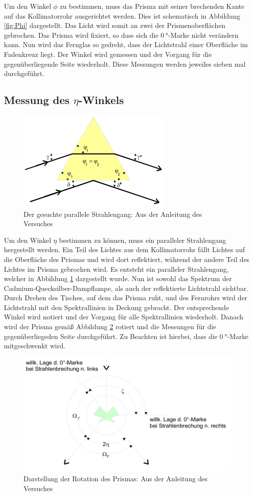 Um den Winkel $\phi$ zu bestimmen, muss das Prisma mit seiner brechenden Kante auf das Kollimatorrohr ausgerichtet werden.
Dies ist schematisch in Abbildung \ref{fig:Phi} dargestellt.
Das Licht wird somit an zwei der Prismenoberflächen gebrochen.
Das Prisma wird fixiert, so dass sich die $\SI{0}{\degree}$-Marke nicht verändern kann.
Nun wird das Fernglas so gedreht, dass der Lichtstrahl einer Oberfläche im Fadenkreuz liegt.
Der Winkel wird gemessen und der Vorgang für die gegenüberliegende Seite wiederholt.
Diese Messungen werden jeweiles sieben mal durchgeführt.

\subsection{Messung des \texorpdfstring{$\eta$}{eta}-Winkels}

\begin{figure}
  \centering
  \includegraphics[scale=0.6]{images/Eta.png}
  \caption{Der gesuchte parallele Strahlengang: Aus der Anleitung des Versuches \cite[26]{1}}
  \label{fig:Eta}
\end{figure}

Um den Winkel $\eta$ bestimmen zu können, muss ein paralleler Strahlengang hergestellt werden.
Ein Teil des Lichtes aus dem Kollimatorrohr fällt Lichtes auf die Oberfläche des Prismas und wird dort reflektiert, während der andere Teil des Lichtes im Prisma gebrochen wird.
Es entsteht ein paralleler Strahlengang, welcher in Abbildung \ref{fig:Eta} dargestellt wurde.
Nun ist sowohl das Spektrum der Cadmium-Quecksilber-Dampflampe, als auch der reflektierte Lichtstrahl sichtbar.
Durch Drehen des Tisches, auf dem das Prisma ruht, und des Fernrohrs wird der Lichtstrahl mit den Spektrallinien in Deckung gebracht.
Der entsprechende Winkel wird notiert und der Vorgang für alle Spektrallinien wiederholt.
Danach wird der Prisma gemäß Abbildung \ref{fig:Drehung} rotiert und die Messungen für die gegenüberliegeden Seite durchgeführt.
Zu Beachten ist hierbei, dass die $\SI{0}{\degree}$-Marke mitgeschwenkt wird.

\begin{figure}
  \centering
  \includegraphics[scale=0.6]{images/Drehung.png}
  \caption{Darstellung der Rotation des Prismas: Aus der Anleitung des Versuches \cite[25]{1}}
  \label{fig:Drehung}
\end{figure}
